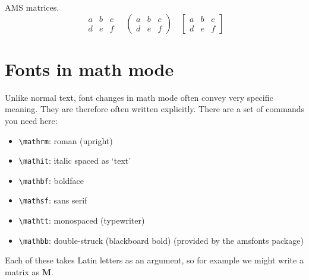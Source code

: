 \documentclass{article}
\begin{document}
AMS matrices.
\[
\begin{matrix}
a & b & c \\
d & e & f
\end{matrix}
\quad
\begin{pmatrix}
a & b & c \\
d & e & f
\end{pmatrix}
\quad
\begin{bmatrix}
a & b & c \\
d & e & f
\end{bmatrix}
\]

\section{Fonts in math mode}
Unlike normal text, font changes in math mode often convey very specific meaning. They are therefore often written explicitly. There are a set of commands you need here:

\begin{itemize}
    \item \verb|\mathrm|: roman (upright)
    \item \verb|\mathit|: italic spaced as ‘text’
    \item \verb|\mathbf|: boldface
    \item \verb|\mathsf|: sans serif
    \item \verb|\mathtt|: monospaced (typewriter)
    \item \verb|\mathbb|: double-struck (blackboard bold) (provided by the amsfonts package)
\end{itemize}

Each of these takes Latin letters as an argument, so for example we might write a matrix as $\mathbf{M}$.
\end{document}
